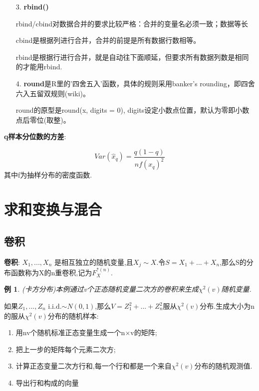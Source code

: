 \documentclass[11pt,a4paper,oneside]{book}
\newtheorem{example}{例}
\begin{document}
\begin{tcolorbox}[colback=pink!10!white,colframe=pink!100!black]
\begin{enumerate}
	\item[3.]\textbf{rbind()}
	
	rbind/cbind对数据合并的要求比较严格：合并的变量名必须一致；数据等长
	
	cbind是根据列进行合并，合并的前提是所有数据行数相等。
	
	rbind是根据行进行合并，就是自动往下面顺延，但要求所有数据列数是相同的才能用rbind.

	\item[4.] \textbf{round}是R里的'四舍五入'函数，具体的规则采用banker's rounding，即四舍六入五留双规则(wiki)。
	
	round的原型是round(x, digits = 0), digits设定小数点位置，默认为零即小数点后零位(取整)。
\end{enumerate}
\end{tcolorbox}

\begin{tcolorbox}[colback=blue!7!white,colframe=blue!40]
\textbf{q样本分位数的方差}:

\begin{equation}
Var(\hat{x}_q)=\frac{q(1-q)}{nf(x_q)^2}
\end{equation}
其中f为抽样分布的密度函数.
\end{tcolorbox}

\section{求和变换与混合}
\subsection{卷积}
\textbf{卷积}: $ X_1,...,X_n$ 是相互独立的随机变量,且$ X_j\sim X $.令$ S=X_1+...+X_n $,那么S的分布函数称为X的n重卷积,记为$ F_X^{*(n)} $.

\begin{example}
(卡方分布)本例通过v个正态随机变量二次方的卷积来生成$ \chi^2(v) $随机变量.
\end{example}
如果$ Z_1,...,Z_n $ i.i.d.$ \sim N(0,1)$,那么$ V=Z_1^2+...+Z_n^2 $服从$ \chi^2(v) $分布.生成大小为n的服从$ \chi^2(v) $分布的随机样本:
\begin{enumerate}
	\item 用nv个随机标准正态变量生成一个n$ \times $v的矩阵;
	\item 把上一步的矩阵每个元素二次方;
	\item 计算正态变量二次方行和,每一个行和都是一个来自$ \chi^2(v) $分布的随机观测值.
	\item 导出行和构成的向量
\end{enumerate}
\end{document}
